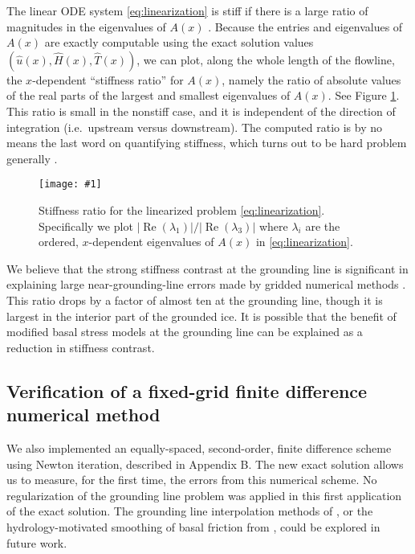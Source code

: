 \documentclass[review,letterpaper]{igs}
\newcommand{\onecol}[1]{\texttt{[image: \#1]}}
\newcommand{\hu}{\hat u}
\newcommand{\hH}{\hat H}
\newcommand{\hT}{\hat T}
\begin{document}
The linear ODE system \eqref{eq:linearization} is stiff if there is a large ratio of magnitudes in the eigenvalues of $A(x)$ \citep{Pressetal}.  Because the entries and eigenvalues of $A(x)$ are exactly computable using the exact solution values $(\hu(x),\hH(x),\hT(x))$, we can plot, along the whole length of the flowline, the $x$-dependent ``stiffness ratio'' for $A(x)$, namely the ratio of absolute values of the real parts of the largest and smallest eigenvalues of $A(x)$.  See Figure \ref{fig:stiffness}.  This ratio is small in the nonstiff case, and it is independent of the direction of integration (i.e.~upstream versus downstream).  The computed ratio is by no means the last word on quantifying stiffness, which turns out to be hard problem generally \citep[e.g.][]{HighamTrefethen1993}.

\begin{figure}[ht]
\onecol{exactmarine-stiffness-ratio}
\caption{Stiffness ratio for the linearized problem \eqref{eq:linearization}.  Specifically we plot $|\operatorname{Re}(\lambda_1)|/|\operatorname{Re}(\lambda_3)|$ where $\lambda_i$ are the ordered, $x$-dependent eigenvalues of $A(x)$ in \eqref{eq:linearization}.} \label{fig:stiffness}
\end{figure}

We believe that the strong stiffness contrast at the grounding line is significant in explaining large near-grounding-line errors made by gridded numerical methods \citep{Gladstoneetal2010,MISMIP2012}.  This ratio drops by a factor of almost ten at the grounding line, though it is largest in the interior part of the grounded ice.  It is possible that the benefit of modified basal stress models at the grounding line \citep[for example]{Leguyetal2014TCD} can be explained as a reduction in stiffness contrast.

\subsection*{Verification of a fixed-grid finite difference numerical method}  We also implemented an equally-spaced, second-order, finite difference scheme using Newton iteration, described in Appendix B.  The new exact solution allows us to measure, for the first time, the errors from this numerical scheme.  No regularization of the grounding line problem was applied in this first application of the exact solution.  The grounding line interpolation methods of \cite{Gladstoneetal2010,Feldmannetal2014}, or the hydrology-motivated smoothing of basal friction from \cite{Leguyetal2014TCD}, could be explored in future work.
\end{document}
